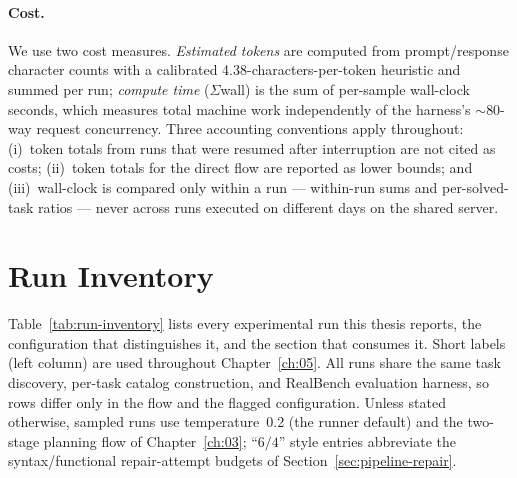 \paragraph{Cost.}
We use two cost measures. \emph{Estimated tokens} are computed from
prompt/response character counts with a calibrated 4.38-characters-per-token
heuristic and summed per run; \emph{compute time} ($\Sigma$wall) is the sum
of per-sample wall-clock seconds, which measures total machine work
independently of the harness's $\sim$80-way request concurrency. Three
accounting conventions apply throughout: (i)~token totals from runs that
were resumed after interruption are not cited as costs; (ii)~token
totals for the direct flow are reported as lower bounds; and
(iii)~wall-clock is compared only within a run --- within-run sums and
per-solved-task ratios --- never across runs executed on different days
on the shared server.

\section{Run Inventory}
\label{sec:setup-runs}

Table~\ref{tab:run-inventory} lists every experimental run this thesis
reports, the configuration that distinguishes it, and the section that
consumes it. Short labels (left column) are used throughout
Chapter~\ref{ch:05}. All runs share the same task discovery, per-task
catalog construction, and RealBench evaluation harness, so rows differ only
in the flow and the flagged configuration. Unless stated otherwise, sampled
runs use temperature~0.2 (the runner default) and the two-stage planning flow of
Chapter~\ref{ch:03}; ``$6/4$'' style entries abbreviate the syntax/functional
repair-attempt budgets of Section~\ref{sec:pipeline-repair}.

